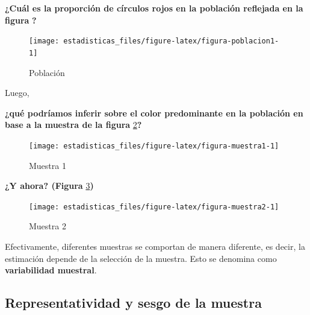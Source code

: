 \documentclass[
  11pt,
]{book}
\theoremstyle{definition}
\theoremstyle{definition}
\theoremstyle{definition}
\theoremstyle{definition}
\theoremstyle{remark}
\begin{document}
\textbf{¿Cuál es la proporción de círculos rojos en la población reflejada en la figura} \textbf{?}

\begin{figure}

{\centering \texttt{[image: estadisticas\_files/figure-latex/figura-poblacion1-1]} 

}

\caption{Población}\label{fig:figura-poblacion1}
\end{figure}

Luego,

\textbf{¿qué podríamos inferir sobre el color predominante en la población en base a la muestra de la figura} \ref{fig:figura-muestra1}\textbf{?}

\begin{figure}

{\centering \texttt{[image: estadisticas\_files/figure-latex/figura-muestra1-1]} 

}

\caption{Muestra 1}\label{fig:figura-muestra1}
\end{figure}

\textbf{¿Y ahora? (Figura} \ref{fig:figura-muestra2}\textbf{)}

\begin{figure}

{\centering \texttt{[image: estadisticas\_files/figure-latex/figura-muestra2-1]} 

}

\caption{Muestra 2}\label{fig:figura-muestra2}
\end{figure}

Efectivamente, diferentes muestras se comportan de manera diferente, es decir, la estimación depende de la selección de la muestra. Esto se denomina como \textbf{variabilidad muestral}.

\subsection{Representatividad y sesgo de la muestra}\label{representatividad-y-sesgo-de-la-muestra}
\end{document}
